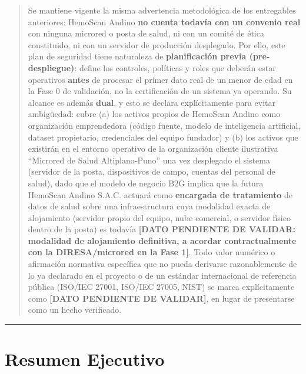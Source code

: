 \documentclass[11pt,a4paper]{article}
\begin{document}
\begin{quote}
Se mantiene vigente la misma advertencia metodológica de los entregables anteriores: HemoScan Andino \textbf{no cuenta todavía con un convenio real} con ninguna microred o posta de salud, ni con un comité de ética constituido, ni con un servidor de producción desplegado. Por ello, este plan de seguridad tiene naturaleza de \textbf{planificación previa (pre-despliegue)}: define los controles, políticas y roles que deberán estar operativos \textbf{antes} de procesar el primer dato real de un menor de edad en la Fase 0 de validación, no la certificación de un sistema ya operando. Su alcance es además \textbf{dual}, y esto se declara explícitamente para evitar ambigüedad: cubre (a) los activos propios de HemoScan Andino como organización emprendedora (código fuente, modelo de inteligencia artificial, dataset propietario, credenciales del equipo fundador) y (b) los activos que existirán en el entorno operativo de la organización cliente ilustrativa ``Microred de Salud Altiplano-Puno'' una vez desplegado el sistema (servidor de la posta, dispositivos de campo, cuentas del personal de salud), dado que el modelo de negocio B2G implica que la futura HemoScan Andino S.A.C. actuará como \textbf{encargada de tratamiento} de datos de salud sobre una infraestructura cuya modalidad exacta de alojamiento (servidor propio del equipo, nube comercial, o servidor físico dentro de la posta) es todavía \textbf{{[}DATO PENDIENTE DE VALIDAR: modalidad de alojamiento definitiva, a acordar contractualmente con la DIRESA/microred en la Fase 1{]}}. Todo valor numérico o afirmación normativa específica que no pueda derivarse razonablemente de lo ya declarado en el proyecto o de un estándar internacional de referencia pública (ISO/IEC 27001, ISO/IEC 27005, NIST) se marca explícitamente como \textbf{{[}DATO PENDIENTE DE VALIDAR{]}}, en lugar de presentarse como un hecho verificado.
\end{quote}

\begin{center}\rule{0.5\linewidth}{0.5pt}\end{center}

\section{Resumen Ejecutivo}\label{resumen-ejecutivo}
\end{document}
